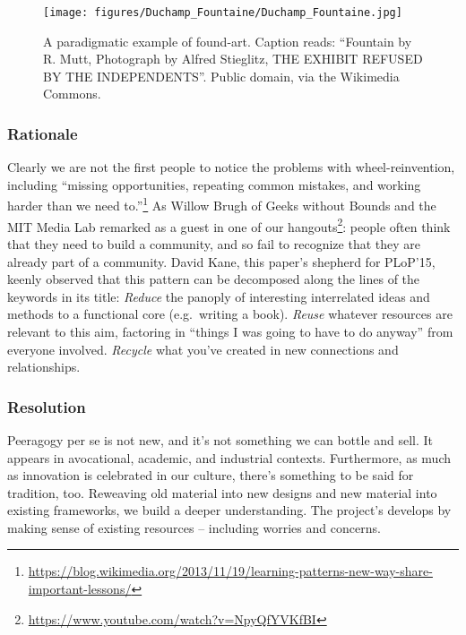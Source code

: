 \begin{wrapfigure}{l}{.42\textwidth}
\vspace{-0cm}
\begin{center}
\texttt{[image: figures/Duchamp\_Fountaine/Duchamp\_Fountaine.jpg]}
\end{center}
\caption{A paradigmatic example of found-art. Caption reads: ``Fountain by R. Mutt, Photograph by Alfred Stieglitz, THE EXHIBIT REFUSED BY THE INDEPENDENTS''. Public domain, via the Wikimedia Commons.\label{fountain}}
\vspace{-0cm}
\end{wrapfigure}

\subsubsection*{Rationale} 
Clearly we are not the first people to notice the problems with wheel-reinvention, including ``missing opportunities, repeating common mistakes, and working harder than we need to.''\footnote{\url{https://blog.wikimedia.org/2013/11/19/learning-patterns-new-way-share-important-lessons/}}  As Willow Brugh of Geeks without Bounds and the MIT Media Lab remarked as a guest in one of our hangouts\footnote{\url{https://www.youtube.com/watch?v=NpyQfYVKfBI}}: people often think that they need to build a community, and so fail to recognize that they are already part of a community.   David Kane, this paper's shepherd for PLoP'15, keenly observed that this pattern can be decomposed along the lines of the keywords in its title:  \emph{Reduce} the panoply of interesting interrelated ideas and methods to a functional core (e.g.~writing a book).  \emph{Reuse} whatever resources are relevant to this aim, factoring in ``things I was going to have to do anyway'' from everyone involved.  \emph{Recycle} what you've created in new connections and relationships.  

\subsubsection*{Resolution}  Peeragogy per se is not new, and it's not something we can bottle and sell. It appears in avocational, academic, and industrial contexts.  Furthermore, as much as innovation is celebrated in our culture, there's something to be said for tradition, too.  Reweaving old material into new designs and new material into existing frameworks, we build a deeper understanding.
%
The project's  develops by making sense of existing resources -- including worries and concerns.

